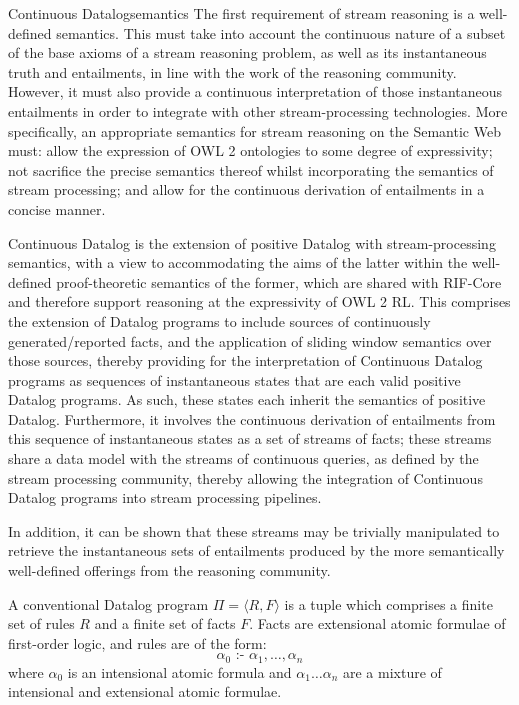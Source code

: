 \begin{nestedsection}{Continuous Datalog}{semantics}
The first requirement of stream reasoning is a well-defined semantics.
This must take into account the continuous nature of a subset of the
base axioms of a stream reasoning problem, as well as its
instantaneous truth and entailments, in line with the work of the
reasoning community.  However, it must also provide a continuous
interpretation of those instantaneous entailments in order to
integrate with other stream-processing technologies.  More
specifically, an appropriate semantics for stream reasoning on the
Semantic Web must: allow the expression of OWL 2 ontologies to some
degree of expressivity; not sacrifice the precise semantics thereof
whilst incorporating the semantics of stream processing; and allow for
the continuous derivation of entailments in a concise manner.

	Continuous Datalog is the extension of positive Datalog with stream-processing semantics, with a view to accommodating the aims of the latter within the well-defined proof-theoretic semantics of the former, which are shared with RIF-Core and therefore support reasoning at the expressivity of OWL 2 RL.
	This comprises the extension of Datalog programs to include sources of continuously generated/reported facts, and the application of sliding window semantics over those sources, thereby providing for the interpretation of Continuous Datalog programs as sequences of instantaneous states that are each valid positive Datalog programs.
	As such, these states each inherit the semantics of positive Datalog.
	Furthermore, it involves the continuous derivation of entailments from this sequence of instantaneous states as a set of streams of facts;
	these streams share a data model with the streams of continuous queries, as defined by the stream processing community, thereby allowing the integration of Continuous Datalog programs into stream processing pipelines.

In addition, it can be shown that these streams may be trivially
manipulated to retrieve the instantaneous sets of entailments produced
by the more semantically well-defined offerings from the reasoning
community.


\begin{definition}
A conventional Datalog program $\Pi = \langle R, F\rangle$ is a tuple
which comprises a finite set of rules $R$ and a finite set of facts
$F$. Facts are extensional atomic formulae of first-order logic, and
rules are of the form:
\[\alpha_0 \text{ :- } \alpha_1 , \ldots , \alpha_n\]
where $\alpha_0$ is an intensional atomic formula and
$\alpha_1 \ldots \alpha_n$ are a mixture of intensional and
extensional atomic formulae.


\end{definition}
\end{nestedsection}

